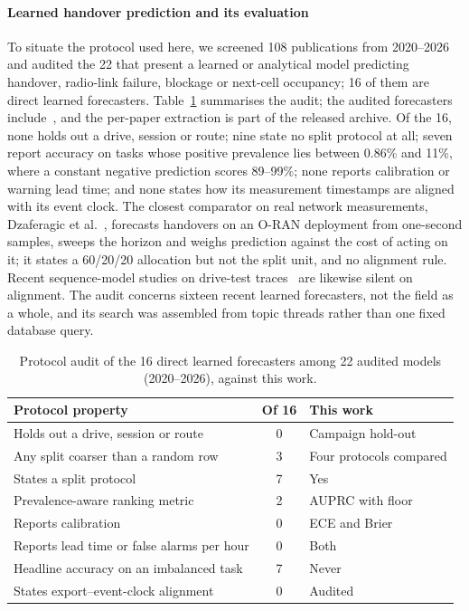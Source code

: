 \documentclass[5p,times,twocolumn]{elsarticle}
\begin{document}
\paragraph{Learned handover prediction and its evaluation} To situate the protocol used here, we screened 108 publications from 2020--2026 and audited the 22 that present a learned or analytical model predicting handover, radio-link failure, blockage or next-cell occupancy; 16 of them are direct learned forecasters. Table~\ref{tab:audit} summarises the audit; the audited forecasters include~\cite{ref15,ref45,ref46,ref54,ref57,ref58,ref59,ref60,ref61,ref62,ref63,ref64,ref65,ref66,ref67,ref68,ref69,ref70}, and the per-paper extraction is part of the released archive. Of the 16, none holds out a drive, session or route; nine state no split protocol at all; seven report accuracy on tasks whose positive prevalence lies between 0.86\% and 11\%, where a constant negative prediction scores 89--99\%; none reports calibration or warning lead time; and none states how its measurement timestamps are aligned with its event clock. The closest comparator on real network measurements, Dzaferagic et al.~\cite{ref54}, forecasts handovers on an O-RAN deployment from one-second samples, sweeps the horizon and weighs prediction against the cost of acting on it; it states a 60/20/20 allocation but not the split unit, and no alignment rule. Recent sequence-model studies on drive-test traces~\cite{ref45,ref46} are likewise silent on alignment. The audit concerns sixteen recent learned forecasters, not the field as a whole, and its search was assembled from topic threads rather than one fixed database query.

\begin{table}[t]
\centering
\caption{Protocol audit of the 16 direct learned forecasters among 22 audited models (2020--2026), against this work.}
\label{tab:audit}
\footnotesize
\begin{tabularx}{\linewidth}{X c l}
\toprule
\textbf{Protocol property} & \textbf{Of 16} & \textbf{This work} \\
\midrule
Holds out a drive, session or route & 0 & Campaign hold-out \\
Any split coarser than a random row & 3 & Four protocols compared \\
States a split protocol & 7 & Yes \\
Prevalence-aware ranking metric & 2 & AUPRC with floor \\
Reports calibration & 0 & ECE and Brier \\
Reports lead time or false alarms per hour & 0 & Both \\
Headline accuracy on an imbalanced task & 7 & Never \\
States export--event-clock alignment & 0 & Audited \\
\bottomrule
\end{tabularx}
\end{table}
\end{document}
